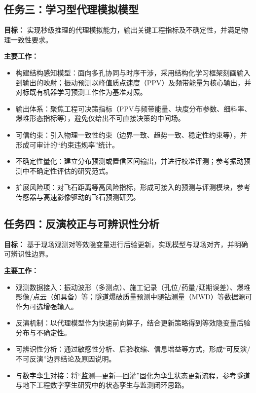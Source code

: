 \documentclass[12pt,a4paper,fontset=mac]{ctexart}
\newcommand{\abbr}[2]{#1（\textsc{#2}）} %
\newcommand{\PPV}{\textsc{PPV}}
\begin{document}
\subsection{任务三：学习型代理模拟模型}
\textbf{目标：} 实现秒级推理的代理模拟能力，输出关键工程指标及不确定性，并满足物理一致性要求。

\textbf{主要工作：}
\begin{itemize}
  \item 构建结构感知模型：面向多孔协同与时序干涉，采用结构化学习框架刻画输入到输出的映射；振动预测以\abbr{峰值质点速度}{PPV}及频带能量为核心输出，并对标既有机器学习预测工作作为基准对照\cite{Hosseini2023PPVEnsemble,Komadja2022SustainabilityPPV,Chen2025CatBoostPPV,BozkurtKeser2025DeepEnsemblePPV}。
  \item 输出体系：聚焦工程可决策指标（\PPV{}与频带能量、块度分布参数、细料率、爆堆形态指标等），避免仅给出不可直接决策的中间场。
  \item 可信约束：引入物理一致性约束（边界一致、趋势一致、稳定性约束等），并形成可审计的“约束违规率”统计。
  \item 不确定性量化：建立分布预测或置信区间输出，并进行校准评测；参考振动预测中不确定性评估的研究范式\cite{BozkurtKeser2025DeepEnsemblePPV}。
  \item 扩展风险项：对飞石距离等高风险指标，形成可接入的预测与评测模块，参考传感器与高速影像驱动的飞石预测研究\cite{Taiwo2024FlyrockML,Mishra2023FlyrockHSV}。
\end{itemize}

\subsection{任务四：反演校正与可辨识性分析}
\textbf{目标：} 基于现场观测对等效隐变量进行后验更新，实现模型与现场对齐，并明确可辨识性边界。

\textbf{主要工作：}
\begin{itemize}
  \item 观测数据接入：振动波形（多测点）、施工记录（孔位/药量/延期误差）、爆堆影像/点云（如具备）等；隧道爆破质量预测中\abbr{随钻测量}{MWD}等数据源可作为可选增强输入\cite{Jin2025MWDQuality}。
  \item 反演机制：以代理模型作为快速前向算子，结合更新策略得到等效隐变量后验分布与不确定性。
  \item 可辨识性分析：通过敏感性分析、后验收缩、信息增益等方式，形成“可反演/不可反演”边界结论及原因说明。
  \item 与数字孪生对接：将“监测—更新—回灌”固化为孪生状态更新流程，参考隧道与地下工程数字孪生研究中的状态孪生与监测闭环思路\cite{Fang2024StatusDTOverUnderExcavation,Zhu2025DTUndergroundInfraReview,Michal2025DTInTunnelConstruction}。
\end{itemize}
\end{document}

